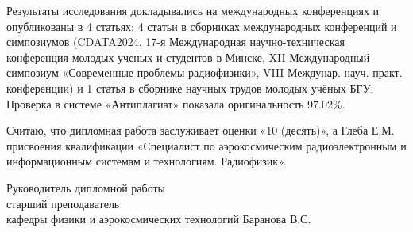 \documentclass[14pt, a4paper]{bsu_review}
\begin{document}
Результаты исследования докладывались на международных конференциях и опубликованы в 4 статьях: 4 статьи в сборниках международных конференций и симпозиумов (CDATA2024, 17-я Международная научно-техническая конференция молодых ученых и студентов в Минске, XII Международный симпозиум «Современные проблемы радиофизики», VIII Междунар. науч.-практ. конференции) и 1 статья в сборнике научных трудов молодых учёных БГУ. Проверка в системе «Антиплагиат» показала оригинальность 97.02\%.

Считаю, что дипломная работа заслуживает оценки «10 (десять)», а Глеба Е.М. присвоения квалификации «Специалист по аэрокосмическим радиоэлектронным и информационным системам и технологиям. Радиофизик».

\vspace{1cm}

\noindent Руководитель дипломной работы\\
старший преподаватель\\
кафедры физики и аэрокосмических технологий
 \hfill Баранова В.С.
\end{document}
